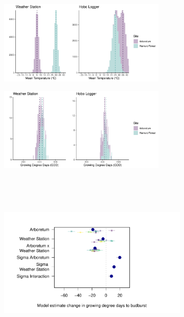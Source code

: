 \documentclass{article}\usepackage[]{graphicx}\usepackage[]{color}
\begin{document}
\begin{figure}
\label{fig:prov}
\end{figure}

\begin{figure}
  \begin{subfigure}{.5\linewidth}
    \caption{}
    \centering
    \includegraphics[height=4cm, width=8cm]{..//analyses/figures/clim_methods_urbanws.pdf}
    \label{fig:gddurbanws}
  \end{subfigure}%
    \begin{subfigure}{.5\linewidth}
      \caption{}
      \centering
      \includegraphics[height=4cm, width=8cm]{..//analyses/figures/gdd_methods_urbanws.pdf}
    \label{fig:climurbanws}
  \end{subfigure}\\[1ex]
  \begin{subfigure}{\linewidth}
	    \caption{}
      \centering
      \includegraphics[height=7cm, width=11cm]{..//analyses/figures/muplot_urbws.pdf}

\end{subfigure}
\end{figure}
\end{document}
